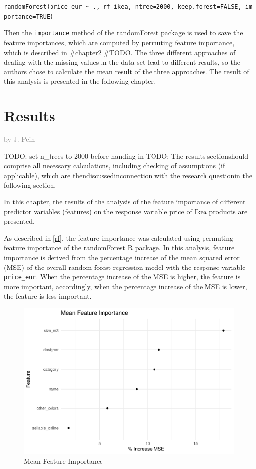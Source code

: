 \documentclass[a4paper, nobind]{templates/ociamthesis}
\begin{document}
\texttt{randomForest(price\_eur\ \textasciitilde{}\ .,\ rf\_ikea,\ ntree=2000,\ keep.forest=FALSE,\ importance=TRUE)}

Then the \texttt{importance} method of the randomForest package is used to save the feature importances, which are computed by permuting feature importance, which is described in \#chapter2 \#TODO. The three different approaches of dealing with the missing values in the data set lead to different results, so the authors chose to calculate the mean result of the three approaches. The result of this analysis is presented in the following chapter.

\hypertarget{results}{%
\chapter{Results}\label{results}}

\hfill\textcolor{gray}{by J. Pein}

TODO: set n\_trees to 2000 before handing in
TODO: The results sectionshould comprise all necessary calculations, including checking of assumptions (if applicable), which are thendiscussedinconnection with the research questionin the following section.

In this chapter, the results of the analysis of the feature importance of different predictor variables (features) on the response variable price of Ikea products are presented.

As described in \ref{rf}, the feature importance was calculated using permuting feature importance of the randomForest R package. In this analysis, feature importance is derived from the percentage increase of the mean squared error (MSE) of the overall random forest regression model with the response variable \texttt{price\_eur}. When the percentage increase of the MSE is higher, the feature is more important, accordingly, when the percentage increase of the MSE is lower, the feature is less important.

\begin{figure}
\includegraphics[width=1\linewidth]{_main_files/figure-latex/mean-feature-importance-1} \caption{Mean Feature Importance}\label{fig:mean-feature-importance}
\end{figure}
\end{document}
